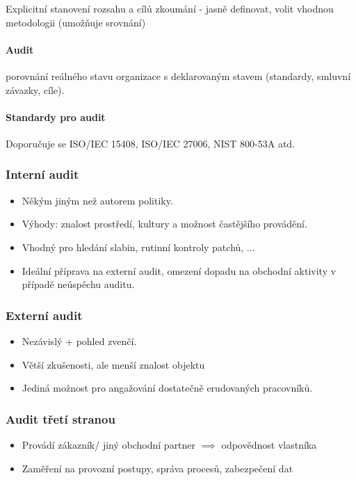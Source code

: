 \documentclass[10pt,a4paper]{article}
\begin{document}
Explicitní stanovení rozsahu a cílů zkoumání - jasně definovat, volit vhodnou metodologii (umožňuje srovnání)

\paragraph*{Audit} porovnání reálného stavu organizace s deklarovaným stavem (standardy, smluvní závazky, cíle).

\paragraph*{Standardy pro audit} Doporučuje se ISO/IEC 15408, ISO/IEC 27006, NIST 800-53A atd.

\subsubsection*{Interní audit} \begin{itemize} \setlength\itemsep{0em}
    \item Někým jiným než autorem politiky.
    \item Výhody: znalost prostředí, kultury a možnost častějšího provádění.
    \item Vhodný pro hledání slabin, rutinní kontroly patchů, ...
    \item Ideální příprava na externí audit, omezení dopadu na obchodní aktivity v případě neúspěchu auditu.
\end{itemize}

\subsubsection*{Externí audit} \begin{itemize} \setlength\itemsep{0em}
    \item Nezávislý + pohled zvenčí.
    \item Větší zkušenosti, ale menší znalost objektu
    \item Jediná možnost pro angažování dostatečně erudovaných pracovníků.
\end{itemize}
 
\subsubsection*{Audit třetí stranou} \begin{itemize} \setlength\itemsep{0em}
    \item Provádí zákazník/ jiný obchodní partner $\implies$ odpovědnost vlastníka
    \item Zaměření na provozní postupy, správa procesů, zabezpečení dat
\end{itemize}
\end{document}
